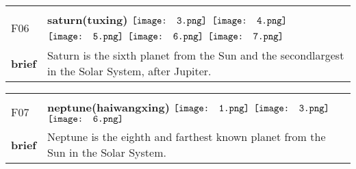 \documentclass[UTF8]{article}
\begin{document}
            \begin{tabularx}{\textwidth}{p{1.5cm}X}
            \arrayrulecolor{myBlue}
        	\hline\\
            \small{F06}&
            \large{\bfseries{saturn(tuxing)}}\hfill
                                                            \phantom{$\vcenter{\hbox{\texttt{[image: 1.png]}}}$}
                                                                \phantom{$\vcenter{\hbox{\texttt{[image: 2.png]}}}$}
                                                                $\vcenter{\hbox{\texttt{[image: 3.png]}}}$
                                                                $\vcenter{\hbox{\texttt{[image: 4.png]}}}$
                                                                $\vcenter{\hbox{\texttt{[image: 5.png]}}}$
                                                                $\vcenter{\hbox{\texttt{[image: 6.png]}}}$
                                                                $\vcenter{\hbox{\texttt{[image: 7.png]}}}$
                                        \\[10pt]
            \large{\bfseries{brief}}&\noindent\parbox[c]{\hsize}{Saturn is the sixth planet from the Sun and the secondlargest in the Solar System, after Jupiter.} \\[5pt]
            \hline\\[-10pt]
        \end{tabularx}
            \begin{tabularx}{\textwidth}{p{1.5cm}X}
            \arrayrulecolor{myBlue}
        	\hline\\
            \small{F07}&
            \large{\bfseries{neptune(haiwangxing)}}\hfill
                                                            $\vcenter{\hbox{\texttt{[image: 1.png]}}}$
                                                                \phantom{$\vcenter{\hbox{\texttt{[image: 2.png]}}}$}
                                                                $\vcenter{\hbox{\texttt{[image: 3.png]}}}$
                                                                \phantom{$\vcenter{\hbox{\texttt{[image: 4.png]}}}$}
                                                                \phantom{$\vcenter{\hbox{\texttt{[image: 5.png]}}}$}
                                                                $\vcenter{\hbox{\texttt{[image: 6.png]}}}$
                                                                \phantom{$\vcenter{\hbox{\texttt{[image: 7.png]}}}$}
                                        \\[10pt]
            \large{\bfseries{brief}}&\noindent\parbox[c]{\hsize}{Neptune is the eighth and farthest known planet from the Sun in the Solar System.} \\[5pt]
            \hline\\[-10pt]
        \end{tabularx}
\end{document}
